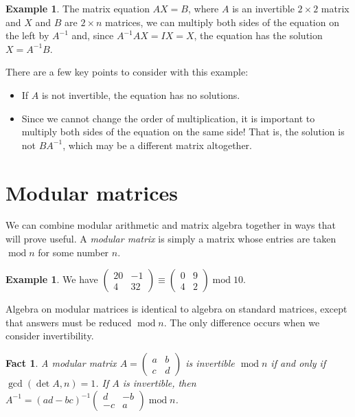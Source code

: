 \documentclass{book}
\theoremstyle{plain}
\newtheorem{fact}[theorem]{Fact}
\theoremstyle{definition}
\newtheorem{example}[theorem]{Example}
\renewcommand{\mod}{\operatorname{mod}}
\renewcommand{\mod}{\operatorname{mod}}
\begin{document}
\begin{example}
The matrix equation $AX = B$, where $A$ is an invertible $2 \times 2$ matrix and $X$ and $B$ are $2 \times n$ matrices, we can multiply both sides of the equation on the left by $A^{-1}$ and, since $A^{-1}AX = IX = X$, the equation has the solution $X = A^{-1}B$.
\end{example}

There are a few key points to consider with this example:
\begin{itemize}
\item If $A$ is not invertible, the equation has no solutions.
\item Since we cannot change the order of multiplication, it is important to multiply both sides of the equation on the same side! That is, the solution is not $BA^{-1}$, which may be a different matrix altogether.
\end{itemize}

\section{Modular matrices}
We can combine modular arithmetic and matrix algebra together in ways that will prove useful. A {\it modular matrix} is simply a matrix whose entries are taken $\mod n$ for some number $n$.

\begin{example}
We have $\begin{pmatrix} 20 & -1 \\ 4 & 32 \end{pmatrix} \equiv \begin{pmatrix} 0 & 9 \\ 4 & 2 \end{pmatrix} \mod 10$.
\end{example}

Algebra on modular matrices is identical to algebra on standard matrices, except that answers must be reduced $\mod n$. The only difference occurs when we consider invertibility.

\begin{fact}
A modular matrix $A = \begin{pmatrix} a & b \\ c & d \end{pmatrix}$ is invertible $\mod n$ if and only if $\gcd(\det A,n) = 1$. If $A$ is invertible, then $A^{-1} = (ad-bc)^{-1}\begin{pmatrix} d & -b \\ -c & a \end{pmatrix} \mod n$.
\end{fact}
\end{document}
